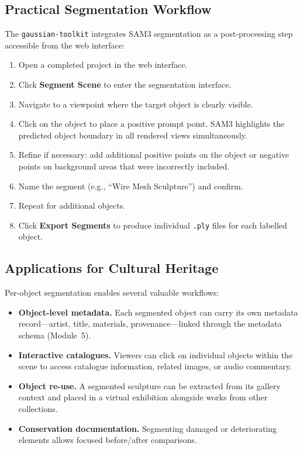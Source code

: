 \subsection{Practical Segmentation Workflow}

The \texttt{gaussian-toolkit} integrates SAM3 segmentation as a post-processing step accessible from the web interface:

\begin{enumerate}
  \item Open a completed project in the web interface.
  \item Click \textbf{Segment Scene} to enter the segmentation interface.
  \item Navigate to a viewpoint where the target object is clearly visible.
  \item Click on the object to place a positive prompt point. SAM3 highlights the predicted object boundary in all rendered views simultaneously.
  \item Refine if necessary: add additional positive points on the object or negative points on background areas that were incorrectly included.
  \item Name the segment (e.g., ``Wire Mesh Sculpture'') and confirm.
  \item Repeat for additional objects.
  \item Click \textbf{Export Segments} to produce individual \texttt{.ply} files for each labelled object.
\end{enumerate}

\subsection{Applications for Cultural Heritage}

Per-object segmentation enables several valuable workflows:

\begin{itemize}
  \item \textbf{Object-level metadata.} Each segmented object can carry its own metadata record---artist, title, materials, provenance---linked through the metadata schema (Module~5).
  \item \textbf{Interactive catalogues.} Viewers can click on individual objects within the scene to access catalogue information, related images, or audio commentary.
  \item \textbf{Object re-use.} A segmented sculpture can be extracted from its gallery context and placed in a virtual exhibition alongside works from other collections.
  \item \textbf{Conservation documentation.} Segmenting damaged or deteriorating elements allows focused before/after comparisons.
\end{itemize}

